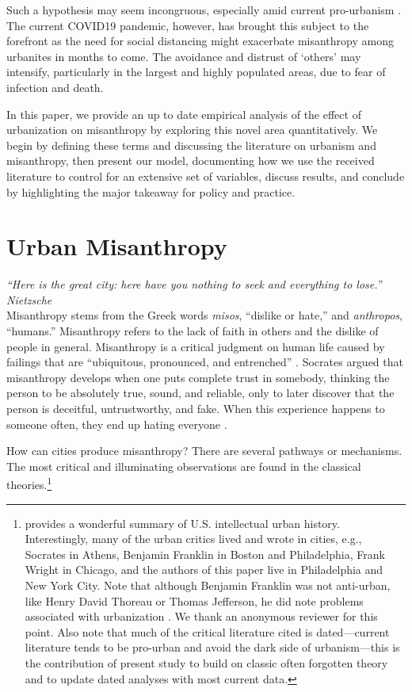 \documentclass[11pt, letterpaper]{article}
\begin{document}
\begin{spacing}{1.4}
Such a hypothesis may seem incongruous, especially amid current pro-urbanism \citep{thrift05,amin06,aokCityBook15}. The current COVID19 pandemic, however, has brought this subject to the forefront as the need for social distancing might exacerbate misanthropy among urbanites in months to come. The avoidance and distrust of `others' may intensify, particularly in the largest and highly populated areas, due to fear of infection and death.
 
In this paper, we provide an up to date empirical analysis of the effect of urbanization on misanthropy by exploring this novel area quantitatively. We begin by defining these terms and discussing the literature on urbanism and misanthropy, then present our model, documenting how we use the received literature to control for an extensive set of variables, discuss results, and conclude by highlighting the major takeaway for policy and practice.   

   
\section*{Urban Misanthropy}

{\small\it \noindent ``Here is the great city: here have you nothing to seek and everything to lose.'' Nietzsche}\\

Misanthropy stems from the Greek words \textit{misos}, ``dislike or hate,'' and
\textit{anthropos}, ``humans.''  Misanthropy refers to the lack of faith in others and the dislike of people in general.
%
Misanthropy is a critical judgment on human life caused by failings that are ``ubiquitous, pronounced, and entrenched'' \citep[p. 7]{cooper2018animals}. Socrates argued that misanthropy develops when one puts complete trust in somebody, thinking the person to be absolutely true, sound, and reliable, only to later discover that the person is deceitful, untrustworthy, and fake. When this experience happens to someone often, they end up hating everyone \citep[cited in][]{melgar13}.

How can cities produce misanthropy? There are several pathways or
mechanisms. The most critical and illuminating observations are found in the
classical  theories.\footnote{\citet{white77} provides a
  wonderful summary of U.S. intellectual urban history. Interestingly, many of
  the urban critics lived and wrote in cities, e.g., Socrates in Athens,
  Benjamin Franklin in Boston and Philadelphia, Frank Wright in Chicago, and the
  authors of this paper live in Philadelphia and New York City. Note that
  although Benjamin Franklin was not anti-urban, like Henry David Thoreau or
  Thomas Jefferson, he did note problems associated with urbanization
  \citep[e.g., p. 32]{white77}. We thank an anonymous reviewer for this
  point. Also note that much of the critical literature cited is dated---current
literature tends to be pro-urban and avoid the dark side of urbanism---this is
the contribution of present study to build on classic often forgotten theory and
to update dated analyses with most current data.} 



\end{spacing}
\end{document}
